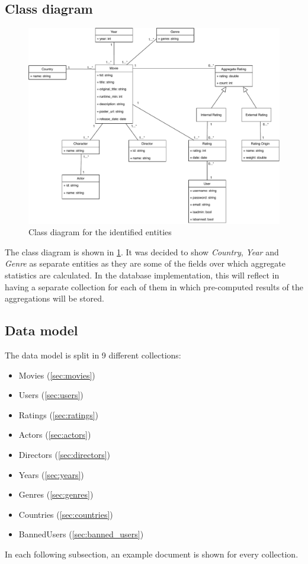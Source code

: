 \documentclass[11pt]{article}
\begin{document}
\subsection{Class diagram}

\begin{figure}[h!]
    \centering
    \includegraphics[width=\textwidth]{figs/class_diagram.pdf}
    \caption{Class diagram for the identified entities}
    \label{fig:class_diagram}
\end{figure}

The class diagram is shown in \cref{fig:class_diagram}. It was decided to show \emph{Country}, \emph{Year} and \emph{Genre} as separate entities as they are some of the fields over which aggregate statistics are calculated. In the database implementation, this will reflect in having a separate collection for each of them in which pre-computed results of the aggregations will be stored.

\clearpage
\subsection{Data model}
The data model is split in 9 different collections:
\begin{itemize}
	\item Movies (\cref{sec:movies})
	\item Users (\cref{sec:users})
	\item Ratings (\cref{sec:ratings})
	\item Actors (\cref{sec:actors})
	\item Directors (\cref{sec:directors})
	\item Years (\cref{sec:years})
	\item Genres (\cref{sec:genres})
	\item Countries (\cref{sec:countries})
	\item BannedUsers (\cref{sec:banned_users})
\end{itemize}
In each following subsection, an example document is shown for every collection.
\end{document}
